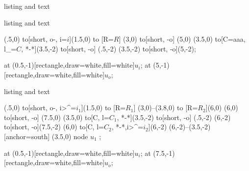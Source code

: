 \documentclass{tikznotes}
\begin{document}
\begin{tcblisting}{listing and text}  
\end{tcblisting}




\begin{tcblisting}{listing and text}  
\begin{circuitikz}
    \draw (.5,0) to[short, o-, i=$i$](1.5,0)
    to [R=$R$] (3,0)
    to[short, -o] (5,0)
    (3.5,0) to[C=aaa, l_=$C$, *-*](3.5,-2)
    to[short, -o] (.5,-2)
    (3.5,-2) to[short, -o](5,-2);

    \node at (0.5,-1)[rectangle,draw=white,fill=white]{$ u_{i} $};
    \node at (5,-1)[rectangle,draw=white,fill=white]{$ u_{o} $};
\end{circuitikz}
\end{tcblisting}



\begin{tcblisting}{listing and text}  
\begin{circuitikz}
\draw (.5,0) to[short, o-, i>^=$i_1$](1.5,0)
to [R=$R_1$] (3,0)--(3.8,0)
to [R=$R_2$](6,0)
(6,0) to[short, -o] (7.5,0)
(3.5,0) to[C, l=$C_{1}$, *-*](3.5,-2)
to[short, -o] (.5,-2)
(6,-2) to[short, -o](7.5,-2)
(6,0) to[C, l=$C_{2}$, *-*,i>^=$i_2$](6,-2)
(6,-2)--(3.5,-2)
{[anchor=south] (3.5,0) node {$ u_{1} $}} ;

\node at (0.5,-1)[rectangle,draw=white,fill=white]{$ u_{i} $};
\node at (7.5,-1)[rectangle,draw=white,fill=white]{$ u_{o} $};		
\end{circuitikz}
\end{tcblisting}
\end{document}
